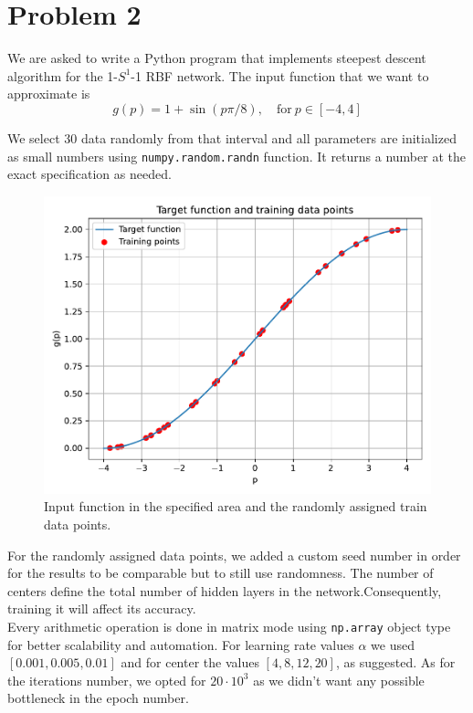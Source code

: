\section{Problem 2}

We are asked to write a Python program that implements steepest descent algorithm for the 1-$S^1$-1 RBF network.
The input function that we want to approximate is 
\[
g(p) = 1 + \sin\left(p\pi/8\right), \quad \text{for} \ p \in \left[-4,4\right]
\]

We select 30 data randomly from that interval and all parameters are initialized as small numbers using \verb|numpy.random.randn| function. It returns a number at the exact specification as needed.

\begin{figure}[htbp]
	\centering
	\includegraphics[width=0.6\linewidth]{../Problem 2/prob2_targetFunc_dataPoints.pdf}
	\caption{Input function in the specified area and the randomly assigned train data points.}
\end{figure}

For the randomly assigned data points, we added a custom seed number in order for the results to be comparable but to still use randomness.
The number of centers define the total number of hidden layers in the network.Consequently, training it will affect its accuracy.\\

Every arithmetic operation is done in matrix mode using \verb|np.array| object type for better scalability and automation.
For learning rate values $\alpha$ we used $\left[0.001, 0.005, 0.01\right]$ and for center the values $\left[4, 8, 12, 20\right]$, as suggested. As for the iterations number, we opted for $20\cdot 10^3$ as we didn't want any possible bottleneck in the epoch number.\\

